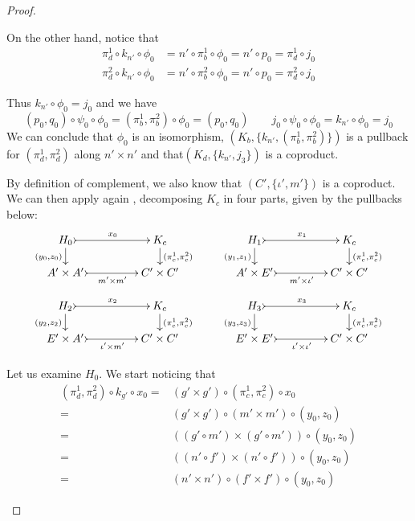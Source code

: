 \documentclass[a4paper,UKenglish,cleveref,pdftex,thm-restate,numberwithinsect]{lipics-v2021}
\begin{document}
\begin{proof}
\begin{enumerate}
{ On the other hand, notice that 
 \begin{align*}
 \pi^1_{d}\circ k_{n'}\circ \phi_0&=n'\circ \pi^1_b\circ \phi_0=n'\circ p_0=\pi^1_d\circ j_0 \\
 \pi^2_{d}\circ k_{n'}\circ \phi_0&=n'\circ \pi^2_b\circ \phi_0=n'\circ p_0=\pi^2_d\circ j_0
 \end{align*}

  Thus $k_{n'}\circ \phi_0=j_0$ and we have
 \[(p_0, q_0)\circ \psi_0\circ \phi_0=(\pi^1_b, \pi^2_b)\circ \phi_0=(p_0, q_0) \qquad  j_0\circ \psi_0\circ \phi_0 = k_{n'}\circ \phi_0=j_0\]
We can conclude that $\phi_0$ is an isomorphism, $(K_b, \{k_{n'}, (\pi^1_b, \pi^2_b)\})$ is a pullback for $(\pi^1_d, \pi^2_d)$ along $n'\times n'$ and  that$(K_d, \{k_{n'}, j_3\})$ is a coproduct.}
 
By definition of complement, we also know that $(C', \{\iota', m'\})$ is a coproduct. We can then apply again , decomposing $K_c$ in four parts, given by the pullbacks below:
 \[\xymatrix@C=45pt@R=15pt{H_0 \ar@{>->}[r]^{x_0}  \ar[d]_{(y_0, z_0)}& K_c   \ar[d]^{(\pi^1_c, \pi^2_c)}& H_1 \ar@{>->}[r]^{x_1}  \ar[d]_{(y_1, z_1)} & K_c \ar[d]^{(\pi^1_c, \pi^2_c)} \\
 	A'\times A' \ar@{>->}[r]_-{m'\times m'} & C'\times C' & A'\times E' \ar@{>->}[r]_-{m'\times  \iota'} & C'\times C'}\]
 \[ \xymatrix@C=45pt@R=15pt{H_2 \ar@{>->}[r]^{x_2}  \ar[d]_{(y_2, z_2)}& K_c   \ar[d]^{(\pi^1_c, \pi^2_c)}& H_3 \ar@{>->}[r]^{x_3}  \ar[d]_{(y_3, z_3)} & K_c \ar[d]^{(\pi^1_c, \pi^2_c)} \\
 	E'\times A' \ar@{>->}[r]_-{\iota' \times m'} & C'\times C' & E'\times E' \ar@{>->}[r]_-{ \iota'\times  \iota'} & C'\times C'}\]
 
 \noindent
\parbox{7cm}{ Let us examine $H_0$. We start noticing that 
 \begin{align*}
 	(\pi^1_d, \pi^2_d)\circ k_{g'}\circ x_0=&(g'\times g')\circ(\pi^1_c, \pi^2_c)\circ x_0\\=&(g'\times g')\circ (m'\times m')\circ (y_0, z_0)\\=&((g'\circ m')\times (g'\circ m'))\circ (y_0, z_0)\\=&((n'\circ f')\times (n'\circ f'))\circ (y_0, z_0)\\=&(n'\times n')\circ (f'\times f')\circ (y_0, z_0) \end{align*}}\hfill \parbox{5cm}{}
 

\end{enumerate}
\end{proof}
\end{document}
